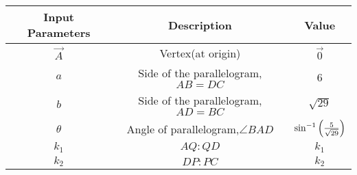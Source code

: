 \begin{tabular}{|c|c|c|}
 \hline
    \textbf{Input Parameters} &\textbf{Description} &\textbf{Value} \\
    \hline
     $\vec{A}$& Vertex(at origin)&$\vec{0}$\\
     \hline
	$a$& Side of the parallelogram,$AB = DC$ & 6 \\
     \hline
	$b$& Side of the parallelogram,$AD = BC$ & $\sqrt{29}$\\
     \hline
	$\theta$&Angle of parallelogram,$\angle BAD$&$\sin^{-1}\left(\frac{5}{\sqrt{29}}\right)$\\
     \hline
	$k_1$&$AQ:QD$&$k_1$\\
     \hline  
	$k_2$ & $DP:PC$ & $k_2$\\
     \hline  
\end{tabular}
